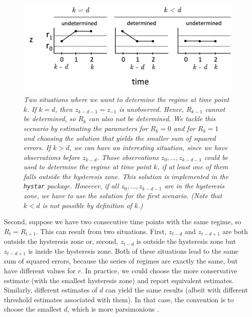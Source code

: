 \documentclass{article}
\begin{document}
\begin{figure}
\begin{center}
\includegraphics[scale=.6]{unknown_start.png}
\caption{\textit{Two situations where we want to determine the regime at time point $k$. 
If $k = d$, then $z_{k-d-1} = z_{-1}$ is unobserved. Hence, $R_{k-1}$ cannot be determined, so $R_{k}$ can also not be determined. We tackle this scenario by estimating the parameters for $R_k = 0$ and for $R_k = 1$ and choosing the solution that yields the smaller sum of squared errors. 
If $k > d$, we can have an interesting situation, since we have observations before $z_{k-d}$. 
Those observations $z_{0}, \dots, z_{k - d - 1}$ could be used to determine the regime at time point $k$, if at least one of them falls outside the hysteresis zone. This solution is implemented in the \texttt{hystar} package. 
However, if all $z_{0}, \dots, z_{k - d - 1}$ are in the hysteresis zone, we have to use the solution for the first scenario. (Note that $k < d$ is not possible by definition of $k$.)}}
\label{fig:unknown_start}
\end{center}
\end{figure}

Second, suppose we have two consecutive time points with the same regime, so $R_t = R_{t+1}$. This can result from two situations. First, $z_{t - d}$ and $z_{t - d + 1}$ are both outside the hysteresis zone or, second, $z_{t - d}$ is outside the hysteresis zone but $z_{t - d + 1}$ is inside the hysteresis zone. Both of these situations lead to the same sum of squared errors, because the series of regimes are exactly the same, but have different values for $r$.
In practice, we could choose the more conservative estimate (with the smallest hysteresis zone) and report equivalent estimates. Similarly, different estimates of $d$ can yield the same results (albeit with different threshold estimates associated with them). 
In that case, the convention is to choose the smallest $d$, which is more parsimonious \citep[][default in the \texttt{hystar}-package]{bar2}.
\end{document}
